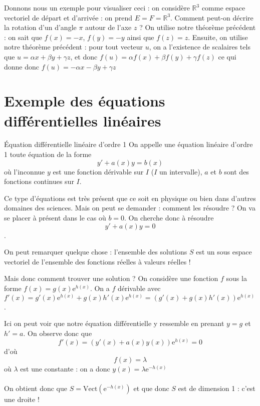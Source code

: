 \documentclass{classe}
\begin{document}
Donnons nous un exemple pour visualiser ceci : on considère $\mathbb{R}^3$ comme espace vectoriel de départ et d'arrivée : on prend $E = F = \mathbb{R}^3$. Comment peut-on décrire la rotation d'un d'angle $\pi$ autour de l'axe $z$ ? On utilise notre théorème précédent : on sait que $f(x) = -x$, $f(y) = -y$ ainsi que $f(z) = z$. Ensuite, on utilise notre théorème précédent : pour tout vecteur $u$, on a l'existence de scalaires tels que $u = \alpha x + \beta y + \gamma z$, et donc $f(u) = \alpha f(x) + \beta f(y) + \gamma f(z)$ ce qui donne donc $f(u) = -\alpha x - \beta y + \gamma z$


\section{Exemple des équations différentielles linéaires}

\begin{définition}{Équation différentielle linéaire d'ordre 1}{}
On appelle une équation linéaire d'ordre 1 toute équation de la forme
$$y' + a(x)y = b(x)$$ 
où l'inconnue $y$ est une fonction dérivable sur $I$ ($I$ un intervalle), $a$ et $b$ sont des fonctions continues sur $I$.
\end{définition}

Ce type d'équations est très présent que ce soit en physique ou bien dans d'autres domaines des sciences. Mais on peut se demander : comment les résoudre ? On va se placer à présent dans le cas où $b=0$. On cherche donc à résoudre 
$$y' + a(x)y = 0$$.

On peut remarquer quelque chose : l'ensemble des solutions $S$ est un sous espace vectoriel de l'ensemble des fonctions réelles à valeurs réelles !

Mais donc comment trouver une solution ? On considère une fonction $f$ sous la forme $f(x) = g(x)\mathrm{e}^{h(x)}$. On a $f$ dérivable avec $f'(x) = g'(x)\mathrm{e}^{h(x)} + g(x)h'(x)\mathrm{e}^{h(x)} = (g'(x) + g(x)h'(x))\mathrm{e}^{h(x)}$.

Ici on peut voir que notre équation différentielle y ressemble en prenant $y = g$ et $h' = a$. On observe donc que
$$f'(x) = (y'(x) + a(x)y(x))\mathrm{e}^{h(x)} = 0$$
d'où 
$$f(x) = \lambda$$
où $\lambda$ est une constante : on a donc $y(x) = \lambda\mathrm{e}^{-h(x)}$
\\\\
On obtient donc que $S = \mathrm{Vect}(\mathrm{e}^{-h(x)})$ et que donc $S$ est de dimension 1 : c'est une droite !
\end{document}
